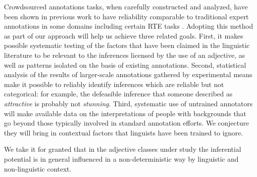 \documentclass[10pt]{article}
\begin{document}
Crowdsourced annotations tasks, when carefully constructed and analyzed, have been shown in previous work to have reliability comparable to traditional expert annotations in some domains including certain RTE tasks \cite{snow:08,munroetal2010}. Adopting this method as part of our approach will help us achieve three related goals. First, it makes possible systematic testing of the factors that have been claimed in the linguistic literature to be relevant to the inferences licensed by the use of an adjective, as well as patterns isolated on the basis of existing annotations. Second, statistical analysis of the results of larger-scale annotations gathered by experimental means make it possible to reliably identify inferences which are reliable but not categorical: for example, the defeasible inference that someone described as \emph{attractive} is probably not \emph{stunning}. Third, systematic use of untrained annotators will make available data on the interpretations of people with backgrounds that go beyond those typically involved in standard annotation efforts. We conjecture they will bring in contextual factors that linguists have been trained to ignore.  

We take it for granted that in the adjective classes under study the inferential potential is in general influenced in a non-deterministic way by linguistic and non-linguistic context.
\end{document}
